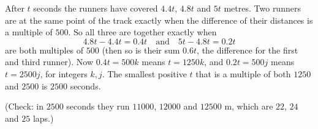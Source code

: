 After $t$ seconds the runners have covered $4.4t$, $4.8t$ and $5t$ metres. Two runners are at the same point of the track exactly when the difference of their distances is a multiple of $500$. So all three are together exactly when
\[4.8t-4.4t=0.4t\quad\text{and}\quad5t-4.8t=0.2t\]
are both multiples of $500$ (then so is their sum $0.6t$, the difference for the first and third runner). Now $0.4t=500k$ means $t=1250k$, and $0.2t=500j$ means $t=2500j$, for integers $k,j$. The smallest positive $t$ that is a multiple of both $1250$ and $2500$ is $\boxed{2500}$ seconds.

(Check: in $2500$ seconds they run $11000$, $12000$ and $12500$ m, which are $22$, $24$ and $25$ laps.)
